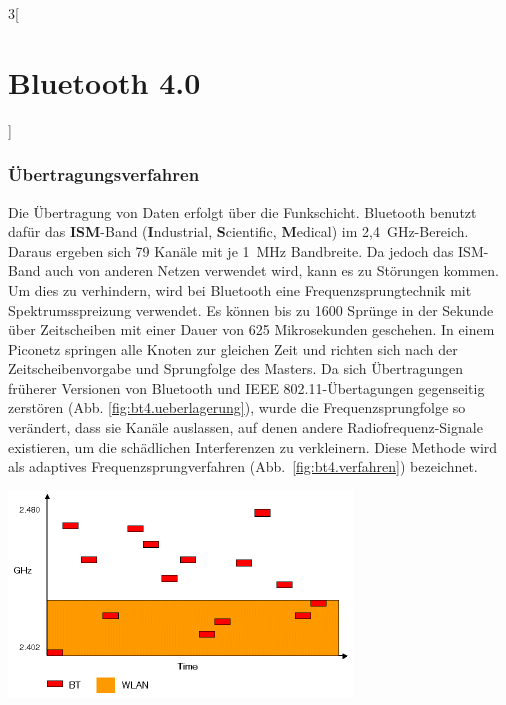 \begin{multicols}{3}[\section{Bluetooth 4.0}]
\subsubsection*{Übertragungsverfahren}
Die Übertragung von Daten erfolgt über die Funkschicht. Bluetooth benutzt dafür das \textbf{ISM}-Band (\textbf{I}ndustrial, \textbf{S}cientific, \textbf{M}edical) im 2,4~GHz-Bereich. Daraus ergeben sich 79 Kanäle mit je 1~MHz Bandbreite. Da jedoch das ISM-Band auch von anderen Netzen verwendet wird, kann es zu Störungen kommen. Um dies zu verhindern, wird bei Bluetooth eine Frequenzsprungtechnik mit Spektrumsspreizung verwendet. Es können bis zu 1600 Sprünge in der Sekunde über Zeitscheiben mit einer Dauer von 625 Mikrosekunden geschehen. In einem Piconetz springen alle Knoten zur gleichen Zeit und richten sich nach der Zeitscheibenvorgabe und Sprungfolge des Masters. Da sich Übertragungen früherer Versionen von Bluetooth und IEEE 802.11-Übertagungen gegenseitig zerstören (Abb. \ref{fig:bt4.ueberlagerung}), wurde die Frequenzsprungfolge so verändert, dass sie Kanäle auslassen, auf denen andere Radiofrequenz-Signale existieren, um die schädlichen Interferenzen zu verkleinern. Diese Methode wird als adaptives Frequenzsprungverfahren (Abb.~\ref{fig:bt4.verfahren}) bezeichnet. \cite{Bluetooth_4.2}

\begin{Figure}
\includegraphics[width=\linewidth]{Kapitel/Bluetooth_4/Grafiken/kollisionen.png}
\label{fig:bt4.ueberlagerung}
\end{Figure}


\end{multicols}
